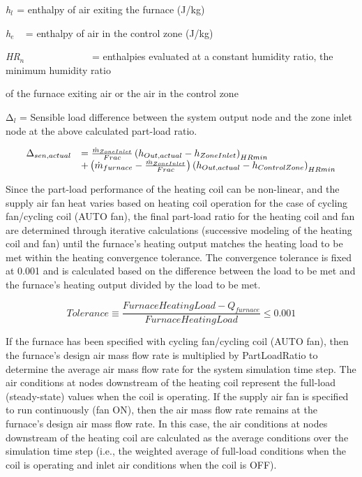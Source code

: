 \emph{h\(_{l}\)}\(_{ }\) = enthalpy of air exiting the furnace (J/kg)

\emph{h\(_{e}\)} ~ = enthalpy of air in the control zone (J/kg)

\emph{HR\(_{n}\)~~~~~~}~~~~~~~ = enthalpies evaluated at a constant humidity ratio, the minimum humidity ratio

of the furnace exiting air or the air in the control zone

Δ\(_{l}\) = Sensible load difference between the system output node and the zone inlet node at the above calculated part-load ratio.

\begin{equation}
  \begin{array}{rl}
    \Delta_{sen,actual} &= \frac{\dot{m}_{ZoneInlet}}{Frac} \PB{h_{Out,actual} - h_{ZoneInlet}}_{HRmin} \\
                           &+ \PB{\dot{m}_{furnace} - \frac{\dot{m}_{ZoneInlet}}{Frac}} \PB{h_{Out,actual} - h_{ControlZone}}_{HRmin}
  \end{array}
\end{equation}

Since the part-load performance of the heating coil can be non-linear, and the supply air fan heat varies based on heating coil operation for the case of cycling fan/cycling coil (AUTO fan), the final part-load ratio for the heating coil and fan are determined through iterative calculations (successive modeling of the heating coil and fan) until the furnace's heating output matches the heating load to be met within the heating convergence tolerance. The convergence tolerance is fixed at 0.001 and is calculated based on the difference between the load to be met and the furnace's heating output divided by the load to be met.

\begin{equation}
  Tolerance \equiv \frac{FurnaceHeatingLoad - Q_{furnace}}{FurnaceHeatingLoad} \leq 0.001
\end{equation}

If the furnace has been specified with cycling fan/cycling coil (AUTO fan), then the furnace's design air mass flow rate is multiplied by PartLoadRatio to determine the average air mass flow rate for the system simulation time step. The air conditions at nodes downstream of the heating coil represent the full-load (steady-state) values when the coil is operating. If the supply air fan is specified to run continuously (fan ON), then the air mass flow rate remains at the furnace's design air mass flow rate. In this case, the air conditions at nodes downstream of the heating coil are calculated as the average conditions over the simulation time step (i.e., the weighted average of full-load conditions when the coil is operating and inlet air conditions when the coil is OFF).

